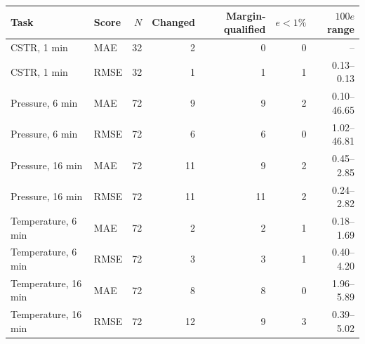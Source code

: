 \begin{tabular}{@{}llrrrrr@{}}
\toprule
Task & Score & $N$ & Changed & Margin-qualified & $e<1\%$ & $100e$ range \\
\midrule
CSTR, 1 min & MAE & 32 & 2 & 0 & 0 & -- \\
CSTR, 1 min & RMSE & 32 & 1 & 1 & 1 & 0.13--0.13 \\
Pressure, 6 min & MAE & 72 & 9 & 9 & 2 & 0.10--46.65 \\
Pressure, 6 min & RMSE & 72 & 6 & 6 & 0 & 1.02--46.81 \\
Pressure, 16 min & MAE & 72 & 11 & 9 & 2 & 0.45--2.85 \\
Pressure, 16 min & RMSE & 72 & 11 & 11 & 2 & 0.24--2.82 \\
Temperature, 6 min & MAE & 72 & 2 & 2 & 1 & 0.18--1.69 \\
Temperature, 6 min & RMSE & 72 & 3 & 3 & 1 & 0.40--4.20 \\
Temperature, 16 min & MAE & 72 & 8 & 8 & 0 & 1.96--5.89 \\
Temperature, 16 min & RMSE & 72 & 12 & 9 & 3 & 0.39--5.02 \\
\bottomrule
\end{tabular}
